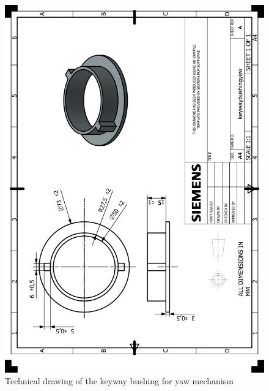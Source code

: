 \documentclass[12pt]{report}
\begin{document}
\begin{appendices}
\begin{figure}[H]
    \centering
    \includegraphics[width=\textwidth]{HP_keywaybushingyaw.png} 
    \caption{Technical drawing of the keyway bushing for yaw mechanism}
    \label{fig:technical-drawing}
\end{figure}


\end{appendices}
\end{document}
